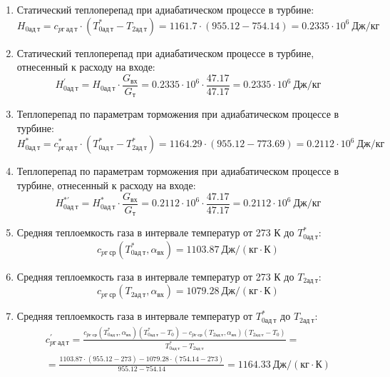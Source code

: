 \documentclass[a4paper,12pt]{article}
\begin{document}
\begin{enumerate}
        \item Статический теплоперепад при адиабатическом процессе в турбине:
        \[
            H_{0ад\ т} = c_{pг\ ад\ т} \cdot \left(
            T_{0ад\ т}^* - T_{2ад\ т}
            \right) =
            1161.7 \cdot \left(
            955.12 - 754.14
            \right) =
            0.2335 \cdot 10^6 \ Дж/кг
        \]

        \item Статический теплоперепад при адиабатическом процессе в турбине, отнесенный к расходу на входе:
        \[
            H_{0ад\ т}^\prime = H_{0ад\ т} \cdot \frac{ G_{вх} }{ G_т }  =
                0.2335 \cdot 10^6 \cdot
                \frac{ 47.17 }{ 47.17 } =
            0.2335 \cdot 10^6 \ Дж/кг
        \]

        \item Теплоперепад по параметрам торможения при адиабатическом процессе в турбине:
        \[
            H_{0ад\ т}^* = c_{pг\ ад\ т}^* \cdot \left(
            T_{0ад\ т}^* - T_{2ад\ т}^*
            \right) =
            1164.29 \cdot \left(
            955.12 - 773.69
            \right) =
            0.2112 \cdot 10^6 \ Дж/кг
        \]

        \item Теплоперепад по параметрам торможения при адиабатическом процессе в турбине, отнесенный к расходу на входе:
        \[
            H_{0ад\ т}^{*\prime} = H_{0ад\ т}^* \cdot \frac{ G_{вх} }{ G_т }  =
                0.2112 \cdot 10^6 \cdot
                \frac{ 47.17 }{ 47.17 } =
            0.2112 \cdot 10^6 \ Дж/кг
        \]

        \item Средняя теплоемкость газа в интервале температур от 273 К до $T_{0ад\ т}^*$:
        \[
            c_{pг\ ср} (T_{0ад\ т}^*, \alpha_{вх}) =
            1103.87 \ Дж/(кг \cdot К)
        \]

        \item Средняя теплоемкость газа в интервале температур от 273 К до $T_{2ад\ т}$:
        \[
            c_{pг\ ср} (T_{2ад\ т}, \alpha_{вх}) =
            1079.28 \ Дж/(кг \cdot К)
        \]

        \item Средняя теплоемкость газа в интервале температур от $T_{0ад\ т}^*$ до $T_{2ад\ т}$:
        \begin{gather*}
            c_{pг\ ад\ т}^\prime = \frac{
		        c_{pг\ ср} (T_{0ад\ т}^*, \alpha_{вх}) (T_{0ад\ т}^* - T_0) - c_{pг\ ср} (T_{2ад\ т}, \alpha_{вх})(T_{2ад\ т} - T_0)
		    }{
		        T_{0ад\ т}^* - T_{2ад\ т}} =\\
            =\frac{
		        1103.87 \cdot
                (955.12 - 273) -
		        1079.28 \cdot
                (754.14 - 273)
		    }{
		        955.12 - 754.14} =
		    1164.33 \ Дж / (кг \cdot К)\\
        \end{gather*}


\end{enumerate}
\end{document}
